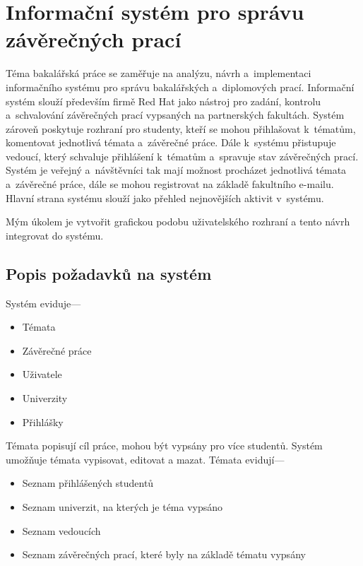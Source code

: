 \chapter{Informační systém pro správu závěrečných prací}

Téma bakalářská práce se zaměřuje na analýzu, návrh a~implementaci informačního systému pro správu bakalářských a~diplomových prací. Informační systém slouží především firmě Red Hat jako nástroj pro zadání, kontrolu a~schvalování závěrečných prací vypsaných na partnerských fakultách. Systém zároveň poskytuje rozhraní pro studenty, kteří se mohou přihlašovat k~tématům, komentovat jednotlivá témata a~závěrečné práce. Dále k~systému přistupuje vedoucí, který schvaluje přihlášení k~tématům a~spravuje stav závěrečných prací. Systém je veřejný a~návštěvníci tak mají možnost procházet jednotlivá témata a~závěrečné práce, dále se mohou registrovat na základě fakultního e-mailu. Hlavní strana systému slouží jako přehled nejnovějších aktivit v~systému.

Mým úkolem je vytvořit grafickou podobu uživatelského rozhraní a tento návrh integrovat do systému.

\section{Popis požadavků na systém}

Systém eviduje---

\begin{itemize}
    \item Témata
    \item Závěrečné práce
    \item Uživatele
    \item Univerzity
    \item Přihlášky
\end{itemize}

Témata popisují cíl práce, mohou být vypsány pro více studentů. Systém umožňuje témata vypisovat, editovat a mazat. Témata evidují---

\begin{itemize}
    \item Seznam přihlášených studentů
    \item Seznam univerzit, na kterých je téma vypsáno
    \item Seznam vedoucích
    \item Seznam závěrečných prací, které byly na základě tématu vypsány
\end{itemize}

